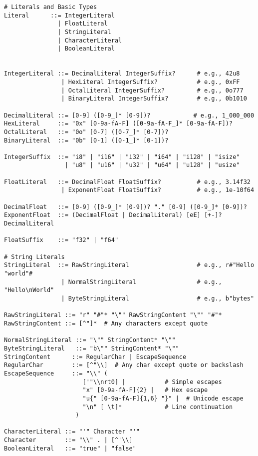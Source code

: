 \begin{verbatim}
# Literals and Basic Types
Literal      ::= IntegerLiteral
               | FloatLiteral
               | StringLiteral
               | CharacterLiteral
               | BooleanLiteral


IntegerLiteral ::= DecimalLiteral IntegerSuffix?      # e.g., 42u8
                | HexLiteral IntegerSuffix?           # e.g., 0xFF
                | OctalLiteral IntegerSuffix?         # e.g., 0o777
                | BinaryLiteral IntegerSuffix?        # e.g., 0b1010

DecimalLiteral ::= [0-9] ([0-9_]* [0-9])?            # e.g., 1_000_000
HexLiteral     ::= "0x" [0-9a-fA-F] ([0-9a-fA-F_]* [0-9a-fA-F])?
OctalLiteral   ::= "0o" [0-7] ([0-7_]* [0-7])?
BinaryLiteral  ::= "0b" [0-1] ([0-1_]* [0-1])?

IntegerSuffix  ::= "i8" | "i16" | "i32" | "i64" | "i128" | "isize"
                 | "u8" | "u16" | "u32" | "u64" | "u128" | "usize"

FloatLiteral   ::= DecimalFloat FloatSuffix?          # e.g., 3.14f32
                | ExponentFloat FloatSuffix?          # e.g., 1e-10f64

DecimalFloat   ::= [0-9] ([0-9_]* [0-9])? "." [0-9] ([0-9_]* [0-9])?
ExponentFloat  ::= (DecimalFloat | DecimalLiteral) [eE] [+-]? DecimalLiteral

FloatSuffix    ::= "f32" | "f64"

# String Literals
StringLiteral  ::= RawStringLiteral                   # e.g., r#"Hello "world"#
                | NormalStringLiteral                 # e.g., "Hello\nWorld"
                | ByteStringLiteral                   # e.g., b"bytes"

RawStringLiteral ::= "r" "#"* "\"" RawStringContent "\"" "#"*
RawStringContent ::= [^"]*  # Any characters except quote

NormalStringLiteral ::= "\"" StringContent* "\""
ByteStringLiteral   ::= "b\"" StringContent* "\""
StringContent      ::= RegularChar | EscapeSequence
RegularChar        ::= [^"\\]  # Any char except quote or backslash
EscapeSequence     ::= "\\" (
                      ['"\\nrt0] |           # Simple escapes
                      "x" [0-9a-fA-F]{2} |   # Hex escape
                      "u{" [0-9a-fA-F]{1,6} "}" |  # Unicode escape
                      "\n" [ \t]*            # Line continuation
                    )

CharacterLiteral ::= "'" Character "'"
Character        ::= "\\" . | [^'\\]
BooleanLiteral   ::= "true" | "false"


\end{verbatim}
